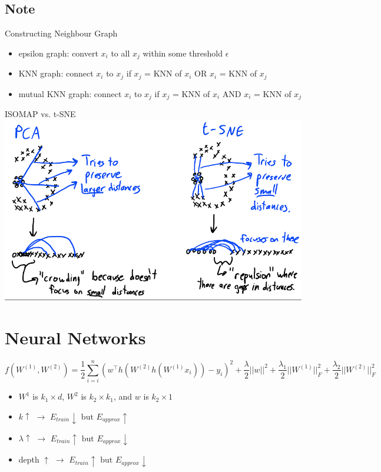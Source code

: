\documentclass[10pt,landscape,a4paper]{article}
\begin{document}
\begin{multicols*}{5}
\subsection{Note}
Constructing Neighbour Graph
\begin{itemize}
    \item epsilon graph: convert \(x_i\) to all \(x_j\) within some threshold \(\epsilon \)
    \item KNN graph: connect \(x_i\) to \(x_j\) if \(x_j\) = KNN of \(x_i\) OR \(x_i\) = KNN of \(x_j\)
    \item mutual KNN graph: connect \(x_i\) to \(x_j\) if \(x_j\) = KNN of \(x_i\) AND \(x_i\) = KNN of \(x_j\)
\end{itemize}
ISOMAP vs. t-SNE \\
\includegraphics[scale=0.15]{isomap_vs_t-sne}

\section{Neural Networks}
\begin{dmath*}
    f(W^{(1)},W^{(2)}) = \frac{1}{2} \sum_{i=i}^{n} (w^\intercal h(W^{(2)}h(W^{(1)}x_i))-y_i)^2 + \frac{\lambda}{2}||w||^2 + \frac{\lambda_1}{2} ||W^{(1)}||_F^2 + \frac{\lambda_2}{2} ||W^{(2)}||_F^2
\end{dmath*}
\begin{itemize}
    \item \(W^1\) is \(k_1 \times d\), \(W^2\) is \(k_2 \times k_1\), and \(w\) is \(k_2 \times 1\)
    \item \(k \uparrow \) \(\rightarrow \) \(E_{train} \downarrow \text{ but } E_{approx} \uparrow \)
    \item \(\lambda \uparrow \) \(\rightarrow \) \(E_{train} \uparrow \text{ but } E_{approx} \downarrow \)
    \item depth \(\uparrow \) \(\rightarrow \) \(E_{train} \uparrow \text{ but } E_{approx} \downarrow \)
\end{itemize}


\end{multicols*}
\end{document}
